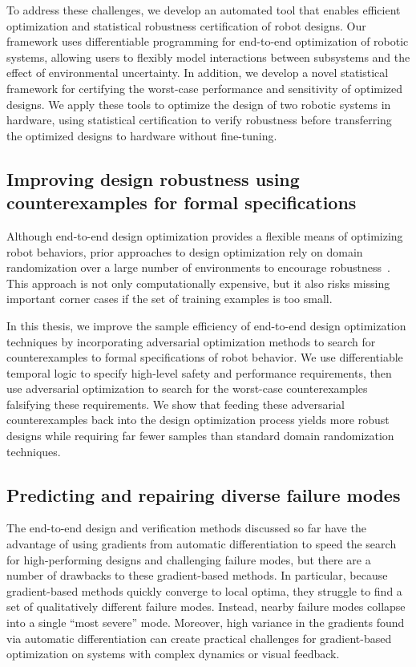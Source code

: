 To address these challenges, we develop an automated tool that enables efficient optimization and statistical robustness certification of robot designs. Our framework uses differentiable programming for end-to-end optimization of robotic systems, allowing users to flexibly model interactions between subsystems and the effect of environmental uncertainty. In addition, we develop a novel statistical framework for certifying the worst-case performance and sensitivity of optimized designs. We apply these tools to optimize the design of two robotic systems in hardware, using statistical certification to verify robustness before transferring the optimized designs to hardware without fine-tuning.

\subsection{Improving design robustness using counterexamples for formal specifications}

Although end-to-end design optimization provides a flexible means of optimizing robot behaviors, prior approaches to design optimization rely on domain randomization over a large number of environments to encourage robustness~\cite{tobinDomainRandomizationTransferring2017,dawsonCertifiableRobotDesign2022}. This approach is not only computationally expensive, but it also risks missing important corner cases if the set of training examples is too small.

In this thesis, we improve the sample efficiency of end-to-end design optimization techniques by incorporating adversarial optimization methods to search for counterexamples to formal specifications of robot behavior. We use differentiable temporal logic to specify high-level safety and performance requirements, then use adversarial optimization to search for the worst-case counterexamples falsifying these requirements. We show that feeding these adversarial counterexamples back into the design optimization process yields more robust designs while requiring far fewer samples than standard domain randomization techniques.

\subsection{Predicting and repairing diverse failure modes}

The end-to-end design and verification methods discussed so far have the advantage of using gradients from automatic differentiation to speed the search for high-performing designs and challenging failure modes, but there are a number of drawbacks to these gradient-based methods. In particular, because gradient-based methods quickly converge to local optima, they struggle to find a set of qualitatively different failure modes. Instead, nearby failure modes collapse into a single ``most severe'' mode. Moreover, high variance in the gradients found via automatic differentiation can create practical challenges for gradient-based optimization on systems with complex dynamics or visual feedback.

